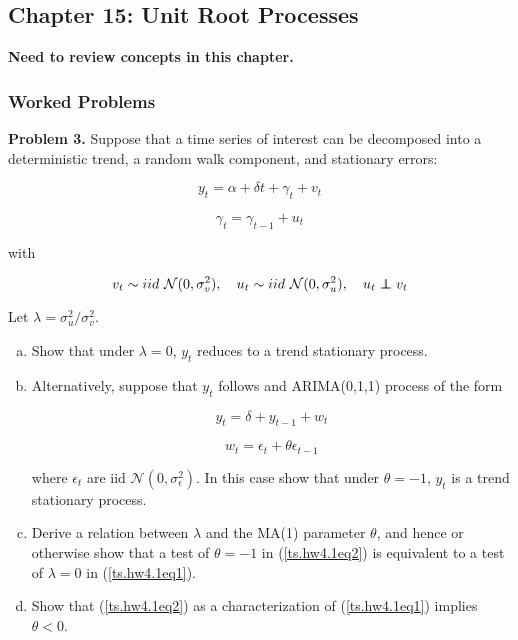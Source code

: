 %
%
%
%
%
%

\subsection{Chapter 15: Unit Root Processes}

\textbf{Need to review concepts in this chapter.}

\subsubsection{Worked Problems}

\textbf{Problem 3.} Suppose that a time series of interest can be decomposed into a deterministic trend, a random walk component, and stationary errors:

\begin{equation} \label{ts.hw4.1eq1}
y_t = \alpha + \delta t + \gamma_t + v_t
\end{equation}

\[
\gamma_t = \gamma_{t-1} + u_t
\]

with

\[
v_t \sim iid \ \mathcal{N}(0, \sigma_v^2), \ \ \ u_t \sim iid \ \mathcal{N}(0, \sigma_u^2), \ \ \ u_t \indep v_t
\]

Let \(\lambda = \sigma_u^2/\sigma_v^2\).

\begin{enumerate}[(a)]

\item Show that under \(\lambda =0\), \(y_t\) reduces to a trend stationary process.

\item Alternatively, suppose that \(y_t\) follows and ARIMA(0,1,1) process of the form

\begin{equation} \label{ts.hw4.1eq2}
y_t = \delta + y_{t-1} + w_t
\end{equation}

\[
w_t = \epsilon_t + \theta \epsilon_{t-1}
\]

where \(\epsilon_t\) are iid \(\mathcal{N}(0, \sigma_\epsilon^2)\). In this case show that under \(\theta = -1\), \(y_t\) is a trend stationary process.

\item Derive a relation between \(\lambda\) and the MA(1) parameter \(\theta\), and hence or otherwise show that a test of \(\theta = -1\) in (\ref{ts.hw4.1eq2}) is equivalent to a test of \(\lambda =0\) in (\ref{ts.hw4.1eq1}).

\item Show that (\ref{ts.hw4.1eq2}) as a characterization of (\ref{ts.hw4.1eq1}) implies \(\theta < 0\).

\end{enumerate}



